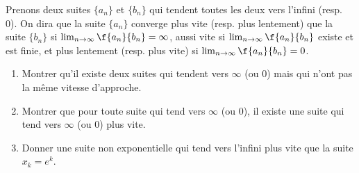 
\begin{exercice}\label{exo0014}

Prenons deux suites $\{a_n\}$ et  $\{b_n\}$ qui tendent toutes les deux vers l'infini (resp. 0). On dira que la suite $\{a_n\}$ converge plus vite (resp. plus lentement) que la suite $\{b_n\}$ si $\lim_{n\rightarrow \infty}\f{a_n}{b_n} = \infty$, aussi vite si $\lim_{n\rightarrow \infty}\f{a_n}{b_n} $ existe et est finie, et plus lentement (resp. plus vite)  si $\lim_{n\rightarrow \infty}\f{a_n}{b_n} = 0$.
\begin{enumerate}
	\item Montrer qu'il existe deux suites qui tendent vers $\infty$ (ou 0) mais qui n'ont pas la même  vitesse d'approche.
	\item Montrer que pour toute suite qui tend vers  $\infty$ (ou 0), il existe une suite qui tend vers  $\infty$ (ou 0) plus vite.
	\item Donner une suite non exponentielle qui tend vers l'infini plus vite que la suite $x_k = e^k$.
\end{enumerate}

\end{exercice}
